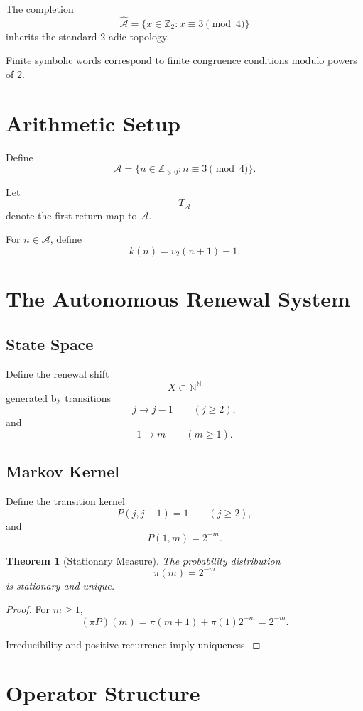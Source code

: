 \documentclass[11pt]{article}
\newtheorem{theorem}{Theorem}[section]
\begin{document}
The completion
\[
\widehat{\mathcal A}
=
\{x\in\mathbb Z_2:x\equiv3\pmod4\}
\]
inherits the standard 2-adic topology.

Finite symbolic words correspond to finite congruence conditions modulo powers
of \(2\).

\section{Arithmetic Setup}

Define
\[
\mathcal A=\{n\in\mathbb Z_{>0}:n\equiv3\pmod4\}.
\]

Let
\[
T_{\mathcal A}
\]
denote the first-return map to \(\mathcal A\).

For \(n\in\mathcal A\), define
\[
k(n)=v_2(n+1)-1.
\]

\section{The Autonomous Renewal System}

\subsection{State Space}

Define the renewal shift
\[
X\subset\mathbb N^{\mathbb N}
\]
generated by transitions
\[
j\to j-1
\qquad (j\ge2),
\]
and
\[
1\to m
\qquad (m\ge1).
\]

\subsection{Markov Kernel}

Define the transition kernel
\[
P(j,j-1)=1
\qquad (j\ge2),
\]
and
\[
P(1,m)=2^{-m}.
\]

\begin{theorem}[Stationary Measure]
The probability distribution
\[
\pi(m)=2^{-m}
\]
is stationary and unique.
\end{theorem}

\begin{proof}
For \(m\ge1\),
\[
(\pi P)(m)
=
\pi(m+1)+\pi(1)2^{-m}
=
2^{-m}.
\]

Irreducibility and positive recurrence imply uniqueness.
\end{proof}

\section{Operator Structure}
\end{document}
